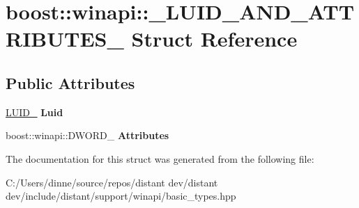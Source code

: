 \hypertarget{structboost_1_1winapi_1_1___l_u_i_d___a_n_d___a_t_t_r_i_b_u_t_e_s__}{}\section{boost\+:\+:winapi\+:\+:\+\_\+\+L\+U\+I\+D\+\_\+\+A\+N\+D\+\_\+\+A\+T\+T\+R\+I\+B\+U\+T\+E\+S\+\_\+ Struct Reference}
\label{structboost_1_1winapi_1_1___l_u_i_d___a_n_d___a_t_t_r_i_b_u_t_e_s__}
\subsection*{Public Attributes}
\begin{DoxyCompactItemize}
\item 
\mbox{\label{structboost_1_1winapi_1_1___l_u_i_d___a_n_d___a_t_t_r_i_b_u_t_e_s___a94426443132148b79a2ba494c1fdee4d}} 
\mbox{\hyperlink{structboost_1_1winapi_1_1___l_u_i_d__}{L\+U\+I\+D\+\_\+}} {\bfseries Luid}
\item 
\mbox{\label{structboost_1_1winapi_1_1___l_u_i_d___a_n_d___a_t_t_r_i_b_u_t_e_s___a4e453012cba54142584fa6a5a1ad1185}} 
boost\+::winapi\+::\+D\+W\+O\+R\+D\+\_\+ {\bfseries Attributes}
\end{DoxyCompactItemize}


The documentation for this struct was generated from the following file\+:\begin{DoxyCompactItemize}
\item 
C\+:/\+Users/dinne/source/repos/distant dev/distant dev/include/distant/support/winapi/basic\+\_\+types.\+hpp\end{DoxyCompactItemize}
